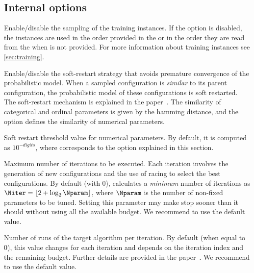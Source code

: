 \subsection[Internal irace options]{Internal \irace options}
\begin{description}
Enable/disable the sampling of the training instances. If the option  is disabled, the instances are used in the order provided in the  or in the order they are read from the  when is not provided. For more information about training instances see \autoref{sec:training}.

  Enable/disable the soft-restart strategy that avoids premature convergence of the probabilistic model. When a sampled configuration is \emph{similar} to its parent configuration, the probabilistic model of these configurations is soft restarted. The soft-restart mechanism is explained in the \irace paper~\citep{LopDubPerStuBir2016irace}. The similarity of categorical and ordinal parameters is given by the hamming distance, and the option  defines the similarity of numerical parameters.

Soft restart threshold value for numerical parameters. By default, it is computed as $10^{-digits}$, where  corresponds to the \irace option explained in this section.

Maximum number of iterations to be executed. Each iteration involves the generation of new configurations and the use of racing to select the best configurations. By default (with 0), \irace calculates a \emph{minimum} number of iterations as $\Niter = \lfloor 2 + \log_{2}\Nparam \rfloor$, where $\Nparam$ is the number of non-fixed parameters to be tuned. Setting this parameter may make \irace stop sooner than it should without using all the available budget. We recommend to use the default value.

Number of runs of the target algorithm per iteration. By default (when equal to 0), this value changes for each iteration and depends on the iteration index and the remaining budget. Further details are provided in the \irace paper~\citep{LopDubPerStuBir2016irace}.
We recommend to use the default value.


\end{description}
